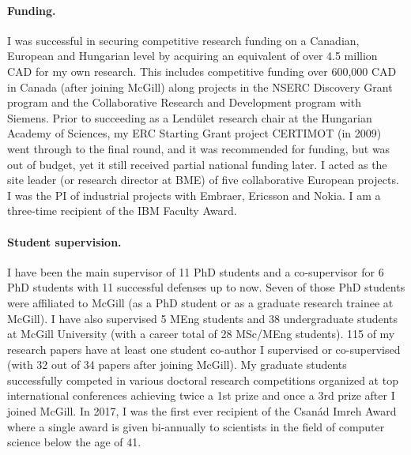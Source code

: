 \paragraph{Funding.}
I was successful in securing competitive research funding on a Canadian, European and Hungarian level by acquiring an equivalent of over 4.5 million CAD for my own research. This includes competitive funding over 600,000 CAD in Canada (after joining McGill) along projects in the NSERC Discovery Grant program and the Collaborative Research and Development program with Siemens. Prior to succeeding as a Lendület research chair at the Hungarian Academy of Sciences, my ERC Starting Grant project CERTIMOT (in 2009) went through to the final round, and it was recommended for funding, but was out of budget, yet it still received partial national funding later. I acted as the site leader (or research director at BME) of five collaborative European projects. %
I was the PI of industrial projects with Embraer, Ericsson and Nokia. I am a three-time recipient of the IBM Faculty Award.

\paragraph{Student supervision.}
I have been the main supervisor of 11 PhD students and a co-supervisor for 6 PhD students with 11 successful defenses up to now. Seven of those PhD students were affiliated to McGill (as a PhD student or as a graduate research trainee at McGill). I have also supervised 5 MEng students and 38 undergraduate students at McGill University (with a career total of 28 MSc/MEng students). 115 of my research papers have at least one student co-author I supervised or co-supervised (with 32 out of 34 papers after joining McGill). My graduate students successfully competed in various doctoral research competitions organized at top international conferences achieving twice a 1st prize and once a 3rd prize after I joined McGill. 
In 2017, I was the first ever recipient of the Csanád Imreh Award where a single award is given bi-annually to scientists in the field of computer science below the age of 41. 

